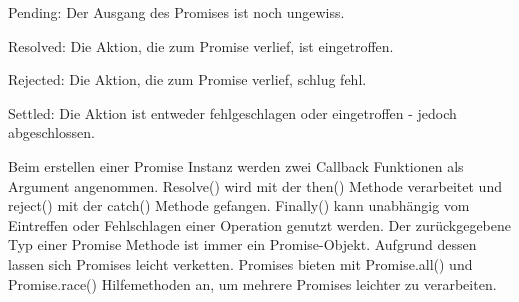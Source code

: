 \begin{description} 
\item Pending: Der Ausgang des Promises ist noch ungewiss.
\item Resolved: Die Aktion, die zum Promise verlief, ist eingetroffen.
\item Rejected: Die Aktion, die zum Promise verlief, schlug fehl.
\item Settled: Die Aktion ist entweder fehlgeschlagen oder eingetroffen - jedoch abgeschlossen.
\end{description}

\noindent
Beim erstellen einer Promise Instanz werden zwei Callback Funktionen als Argument angenommen. Resolve() wird mit der then() Methode verarbeitet und reject() mit der catch() Methode gefangen. Finally() kann unabhängig vom Eintreffen oder Fehlschlagen einer Operation genutzt werden. Der zurückgegebene Typ einer Promise Methode ist immer ein Promise-Objekt. Aufgrund dessen lassen sich Promises leicht verketten. Promises bieten mit Promise.all() und Promise.race() Hilfemethoden an, um mehrere Promises leichter zu verarbeiten.




